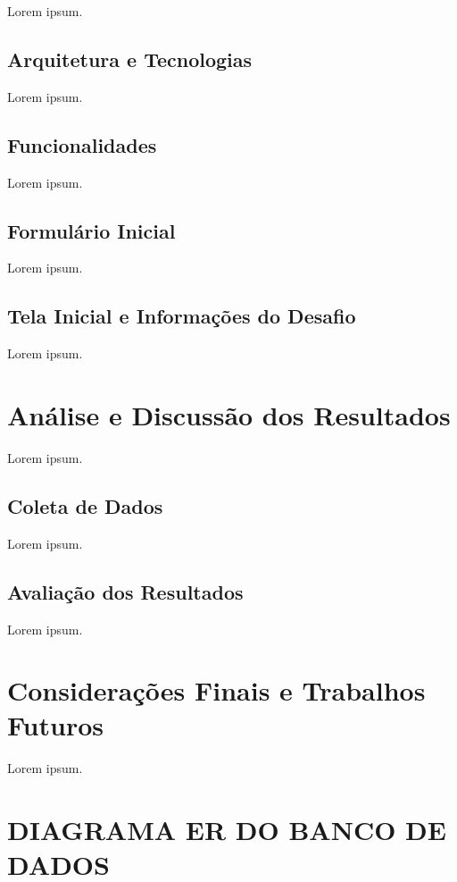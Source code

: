 \documentclass[english,brazilian]{UNISINOSartigo} %
\begin{document}
Lorem ipsum.

\subsection{Arquitetura e Tecnologias}

Lorem ipsum.

\subsection{Funcionalidades}

Lorem ipsum.

\subsection{Formulário Inicial}

Lorem ipsum.

\subsection{Tela Inicial e Informações do Desafio}

Lorem ipsum.

\section{Análise e Discussão dos Resultados}

Lorem ipsum.

\subsection{Coleta de Dados}

Lorem ipsum.

\subsection{Avaliação dos Resultados}

Lorem ipsum.

\section{Considerações Finais e Trabalhos Futuros}

Lorem ipsum.



\appendix
\section{DIAGRAMA ER DO BANCO DE DADOS}
\end{document}
